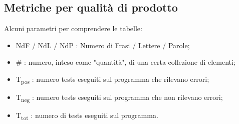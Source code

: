 \subsection{Metriche per qualità di prodotto}
Alcuni parametri per comprendere le tabelle:
\begin{itemize}
    \item NdF / NdL / NdP : Numero di Frasi / Lettere / Parole;
    \item \# : numero, inteso come "quantità", di una certa collezione di elementi; 
    \item T\textsubscript{pos} : numero tests eseguiti sul programma che rilevano errori;
    \item  T\textsubscript{neg} : numero tests eseguiti sul programma che non rilevano errori;
    \item T\textsubscript{tot} : numero di tests eseguiti sul programma.
\end{itemize}
